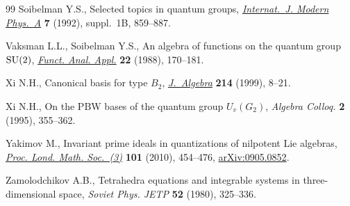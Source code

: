 \documentclass[pdftex]{sigma}
\begin{document}
\begin{thebibliography}{99}
Soibelman Y.S., Selected topics in quantum groups, \href{http://dx.doi.org/10.1142/S0217751X92004087}{\textit{Internat.~J. Modern
  Phys.~A}} \textbf{7} (1992), suppl.~1B, 859--887.

Vaksman L.L., Soibelman Y.S., An algebra of functions on the quantum group
  {${\rm SU}(2)$}, \href{http://dx.doi.org/10.1007/BF01077623}{\textit{Funct. Anal. Appl.}} \textbf{22} (1988), 170--181.

Xi N.H., Canonical basis for type {$B_2$}, \href{http://dx.doi.org/10.1006/jabr.1998.7688}{\textit{J.~Algebra}} \textbf{214}
  (1999), 8--21.

Xi N.H., On the {PBW} bases of the quantum group {$U_v(G_2)$}, \textit{Algebra
  Colloq.} \textbf{2} (1995), 355--362.

Yakimov M., Invariant prime ideals in quantizations of nilpotent {L}ie
  algebras, \href{http://dx.doi.org/10.1112/plms/pdq006}{\textit{Proc. Lond. Math. Soc.~(3)}} \textbf{101} (2010), 454--476,
  \href{http://arxiv.org/abs/0905.0852}{arXiv:0905.0852}.

Zamolodchikov A.B., Tetrahedra equations and integrable systems in
  three-dimensional space, \textit{Soviet Phys. JETP} \textbf{52} (1980),
  325--336.

\end{thebibliography}\LastPageEnding
\end{document}
